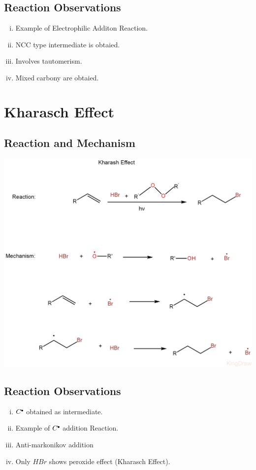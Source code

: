 \documentclass{article}
\newcommand*\fullcirc[1][0.3ex]{\tikz\fill (0,0) circle (#1);}
\begin{document}
\subsection{Reaction Observations}
\begin{enumerate}[i.]
    \item Example of Electrophilic Additon Reaction.
    \item NCC type intermediate is obtaied.
    \item Involves tautomerism.
    \item Mixed carbony are obtaied.
\end{enumerate}

\section{Kharasch Effect}
\subsection{Reaction and Mechanism}
\includegraphics[scale=0.27]{KharaschEffect_1722410819316.JPEG}
\subsection{Reaction Observations}
\begin{enumerate}[i.]
    \item $C^{\fullcirc}$ obtained as intermediate.
    \item Example of $C^{\fullcirc}$ addition Reaction.
    \item Anti-markonikov addition
    \item Only $HBr$ shows peroxide effect (Kharasch Effect).
\end{enumerate}
\end{document}
